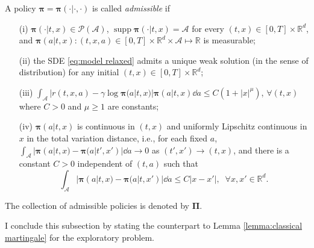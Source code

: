 \begin{definition}
	\label{ass:admissible}
	A policy $\bm{\pi}=\bm{\pi}(\cdot|\cdot,\cdot)$ is called {\it admissible} if
	\begin{enumerate}
		\item[(i)] $\bm{\pi}(\cdot|t,x)\in \mathcal{P}(\mathcal{A})$, $\operatorname{supp}\bm\pi(\cdot|t,x) = \mathcal{A}$ for every $(t,x)\in [0,T]\times \mathbb{R}^d$, and $\bm{\pi}(a|t,x):(t,x,a)\in [0,T] \times \mathbb{R}^d\times \mathcal{A}\mapsto
		\mathbb{R}$ is measurable;
		\item[(ii)] the SDE \eqref{eq:model relaxed} admits a unique weak solution (in the sense of distribution) for any initial $(t,x)\in [0,T] \times \mathbb{R}^d$;
		\item[(iii)] 		$\int_{\mathcal{A}} |r(t,x,a) - \gamma \log\bm{\pi}(a|t,x) | \bm{\pi}(a|t,x)\dd a \leq C(1+|x|^{\mu})$,  $\forall (t,x)$ where $C>0$ and $\mu\geq 1$ are constants;
		\item[(iv)] $\bm{\pi}(a|t,x)$ is continuous in $(t,x)$  and uniformly Lipschitz continuous in $x$ in the total variation distance, i.e., for each fixed $a$, $ \int_{\mathcal{A}} |\bm{\pi}(a|t,x) - \bm{\pi}(a|t',x')|\dd a \to 0$ as $(t',x')\to (t,x)$, and
		there is a constant $C>0$ independent of $(t,a)$ such that
		\[ \int_{\mathcal{A}} |\bm{\pi}(a|t,x) - \bm{\pi}(a|t,x')|\dd a \leq C|x-x'|,\;\;\forall x,x'\in \mathbb{R}^d. \]
	\end{enumerate}
	The collection of admissible policies is denoted by $\bm\Pi$.
\end{definition}






I conclude this subsection by stating the counterpart to Lemma \ref{lemma:classical martingale} for the exploratory problem. 

